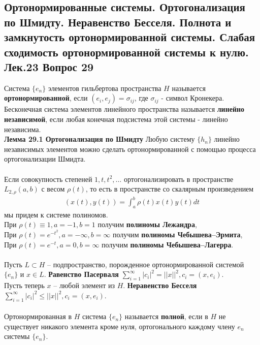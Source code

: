 \documentclass{article}
\begin{document}
\subsection{Ортонормированные системы. Ортогонализация по Шмидту. Неравенство Бесселя. Полнота и замкнутость ортонормированной системы. Слабая сходимость ортонормированной системы к нулю. Лек.23 \textbf{Вопрос 29}}
	Система $\{{e}_{n}\}$ элементов гильбертова пространства $H$ называется \textbf{ортонормированной}, если $({e}_{i},{e}_{j})=\sigma_{ij}$, где $\sigma_{ij}$ - символ Кронекера.\\
	Бесконечная система элементов линейного пространства
	называется \textbf{линейно независимой}, если любая конечная подсистема этой системы - линейно независима.\\
	\textbf{Лемма 29.1 Ортогонализация по Шмидту} Любую систему $\{{h}_{n}\}$ линейно независимых элементов можно
	сделать ортонормированной с помощью процесса ортогонализации Шмидта.\\
	\\
	Если совокупность степеней $1,t,{t}^{2},\ldots$ ортогонализировать в пространстве $L_{2,\rho}(a,b)$ с весом $\rho(t)$, то есть в пространстве со скалярным произведением
	\begin{equation}
	\begin{aligned}
	(x(t),y(t))=\int_{a}^{b} \rho(t)x(t)y(t)dt
	\end{aligned}
	\end{equation}
	мы придем к системе полиномов.\\ 
	При $\rho(t)\equiv 1,a=-1,b=1$ получим \textbf{полиномы Лежандра},\\ 
	При $\rho(t)= {e}^{-{t}^{2}},a=-\infty,b=\infty$ получим \textbf{полиномы Чебышева–Эрмита},\\
	При $\rho(t)= {e}^{-t},a=0,b=\infty$ получим \textbf{полиномы Чебышева–Лагерра}.\\
	\\
	Пусть $L\subset H$ – подпространство, порожденное ортонормированной системой $\{{e}_{n}\}$ и $x\in L$. \textbf{Равенство Пасерваля} $\sum_{i=1}^{\infty} {|{c}_{i}|}^{2}={||x||}^{2}, {c}_{i}=(x,{e}_{i})$.\\
	Пусть теперь $x$ – любой элемент из $H$. \textbf{Неравенство Бесселя} $\sum_{i=1}^{\infty} {|{c}_{i}|}^{2}\le {||x||}^{2}, {c}_{i}=(x,{e}_{i})$.\\
	\\
	Ортонормированная в $H$ система $\{{e}_{n}\}$ называется \textbf{полной}, если в $H$ не существует никакого элемента кроме нуля, ортогонального каждому члену ${e}_{n}$ системы $\{{e}_{n}\}$.\\
\end{document}
